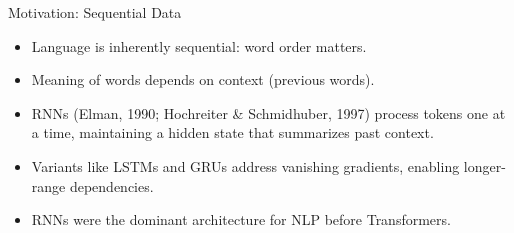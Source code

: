 \documentclass[aspectratio=169]{beamer}
\begin{document}
\begin{frame}{Motivation: Sequential Data}
  \begin{itemize}
    \item Language is inherently sequential: word order matters.
    \item Meaning of words depends on context (previous words).
    \item RNNs (Elman, 1990; Hochreiter \& Schmidhuber, 1997) process tokens one at a time, maintaining a hidden state that summarizes past context.
    \item Variants like LSTMs and GRUs address vanishing gradients, enabling longer-range dependencies.
    \item RNNs were the dominant architecture for NLP before Transformers.
  \end{itemize}
\end{frame}
\end{document}
